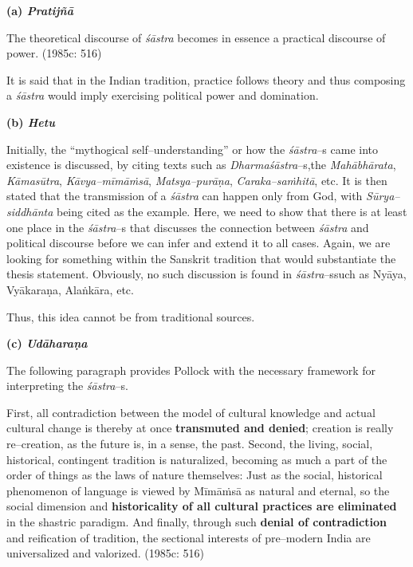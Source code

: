 \textbf{(a) \textit{Pratijñā }}

\begin{myquote}
The theoretical discourse of \textit{śāstra} becomes in essence a practical discourse of power. (1985c: 516)
\end{myquote}

It is said that in the Indian tradition, practice follows theory and thus composing a\textit{ śāstra }would imply exercising political power and domination.

\textbf{(b) \textit{Hetu}}

Initially, the “mythogical self–understanding” or how the \textit{śāstra}–s came into existence is discussed, by citing texts such as \textit{Dharmaśāstra}–s,\break the \textit{Mahābhārata}, \textit{Kāmasūtra}, \textit{Kāvya–mīmāṁsā}, \textit{Matsya–purāṇa}, \textit{Caraka–saṁhitā}, etc. It is then stated that the transmission of a \textit{śāstra }can happen only from God, with \textit{Sūrya–siddhānta} being cited as the example. Here, we need to show that there is at least one place in the\textit{ śāstra}–s that discusses the connection between \textit{śāstra} and political discourse before we can infer and extend it to all cases. Again, we are looking for something within the Sanskrit tradition that would substantiate the thesis statement. Obviously, no such discussion is found in \textit{śāstra}–s\break such as Nyāya, Vyākaraṇa, Alaṅkāra, etc.

Thus, this idea cannot be from traditional sources.

\textbf{(c) \textit{Udāharaṇa}}

The following paragraph provides Pollock with the necessary framework for interpreting the \textit{śāstra}–s.

\begin{myquote}
First, all contradiction between the model of cultural knowledge and actual cultural change is thereby at once \textbf{transmuted and denied}; creation is really re–creation, as the future is, in a sense, the past. Second, the living, social, historical, contingent tradition is naturalized, becoming as much a part of the order of things as the laws of nature themselves: Just as the social, historical phenomenon of language is viewed by Mīmāṁsā as natural and eternal, so the social dimension and \textbf{historicality of all cultural practices are eliminated} in the shastric paradigm. And finally, through such \textbf{denial of contradiction} and reification of tradition, the sectional interests of pre–modern India are universalized and valorized. (1985c: 516)
\end{myquote}

